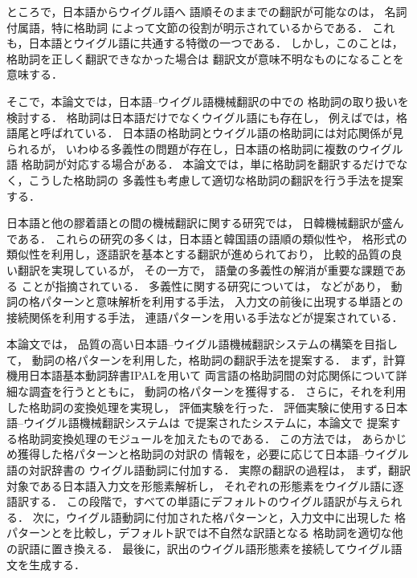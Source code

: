 ところで，日本語からウイグル語へ
語順そのままでの翻訳が可能なのは，
名詞付属語，特に格助詞
によって文節の役割が明示されているからである．
これも，日本語とウイグル語に共通する特徴の一つである．
しかし，このことは，格助詞を正しく翻訳できなかった場合は
翻訳文が意味不明なものになることを意味する．

そこで，本論文では，日本語--ウイグル語機械翻訳の中での
格助詞の取り扱いを検討する．
格助詞は日本語だけでなくウイグル語にも存在し，
例えば\cite{TAKEUTI}では，格語尾と呼ばれている．
日本語の格助詞とウイグル語の格助詞には対応関係が見られるが，
いわゆる多義性の問題が存在し，日本語の格助詞に複数のウイグル語
格助詞が対応する場合がある．
本論文では，単に格助詞を翻訳するだけでなく，こうした格助詞の
多義性も考慮して適切な格助詞の翻訳を行う手法を提案する．

日本語と他の膠着語との間の機械翻訳に関する研究では，
日韓機械翻訳が盛んである\cite{KMT4,H_LEE1989,J_KIM1996_2,C_PARK1997}．
これらの研究の多くは，日本語と韓国語の語順の類似性や，
格形式の類似性を利用し，逐語訳を基本とする翻訳が進められており，
比較的品質の良い翻訳を実現しているが，
その一方で，
語彙の多義性の解消が重要な課題である
ことが指摘されている\cite{KMT4}．
多義性に関する研究については，
\cite{H_LEE1989,J_KIM1996_2,C_PARK1997}などがあり，
動詞の格パターンと意味解析を利用する手法\cite{H_LEE1989}，
入力文の前後に出現する単語との接続関係を利用する手法\cite{J_KIM1996_2}，
連語パターンを用いる手法\cite{C_PARK1997}などが提案されている．

本論文では，
品質の高い日本語--ウイグル語機械翻訳システムの構築を目指して，
動詞の格パターンを利用した，格助詞の翻訳手法を提案する．
まず，計算機用日本語基本動詞辞書IPAL\cite{IPAL}を用いて
両言語の格助詞間の対応関係について詳細な調査を行うとともに，
動詞の格パターンを獲得する．
さらに，それを利用した格助詞の変換処理を実現し，
評価実験を行った．
評価実験に使用する日本語--ウイグル語機械翻訳システムは
\cite{OGAWA2000}で提案されたシステムに，本論文で
提案する格助詞変換処理のモジュールを加えたものである．
この方法では，
あらかじめ獲得した格パターンと格助詞の対訳の
情報を，必要に応じて日本語--ウイグル語の対訳辞書の
ウイグル語動詞に付加する．
実際の翻訳の過程は，
まず，翻訳対象である日本語入力文を形態素解析し，
それぞれの形態素をウイグル語に逐語訳する．
この段階で，すべての単語にデフォルトのウイグル語訳が与えられる．
次に，ウイグル語動詞に付加された格パターンと，入力文中に出現した
格パターンとを比較し，デフォルト訳では不自然な訳語となる
格助詞を適切な他の訳語に置き換える．
最後に，訳出のウイグル語形態素を接続してウイグル語文を生成する．

